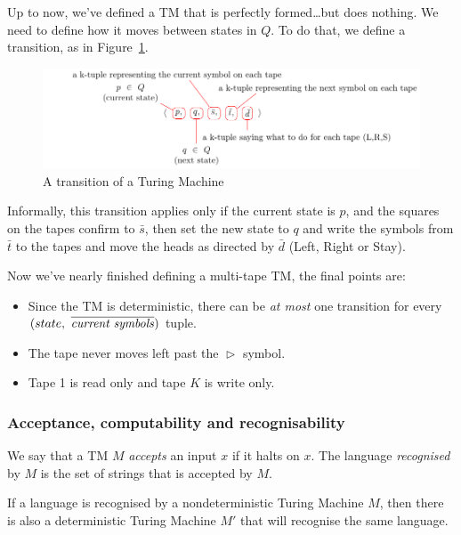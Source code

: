 Up to now, we've defined a TM that is perfectly formed\dots but does nothing. We
need to define how it moves between states in $Q$. To do that, we define a
transition, as in Figure~\ref{fig:tm-transition}.

\begin{figure}[H]
  \centering
  \includegraphics{equations/tm-transition}
  \caption{A transition of a Turing Machine}
  \label{fig:tm-transition}
\end{figure}

Informally, this transition applies only if the current state is $p$, and the
squares on the tapes confirm to $\bar{s}$, then set the new state to $q$ and
write the symbols from $\bar{t}$ to the tapes and move the heads as directed by
$\bar{d}$ (Left, Right or Stay).

Now we've nearly finished defining a multi-tape TM, the final points are:

\begin{itemize}
  \item Since the TM is deterministic, there can be \textit{at most} one 
    transition for every $(state,~\overline{\text{\textit{current symbols}}})$ 
    tuple.
  \item The tape never moves left past the $\vartriangleright$ symbol.
  \item Tape 1 is read only and tape $K$ is write only.
\end{itemize}

\subsubsection{Acceptance, computability and recognisability}

We say that a TM $M$ \textit{accepts} an input $x$ if it halts on $x$. The
language \textit{recognised} by $M$ is the set of strings that is accepted by
$M$.


If a language is recognised by a nondeterministic Turing Machine $M$, then there
is also a  deterministic Turing Machine $M'$ that will recognise the same
language.

